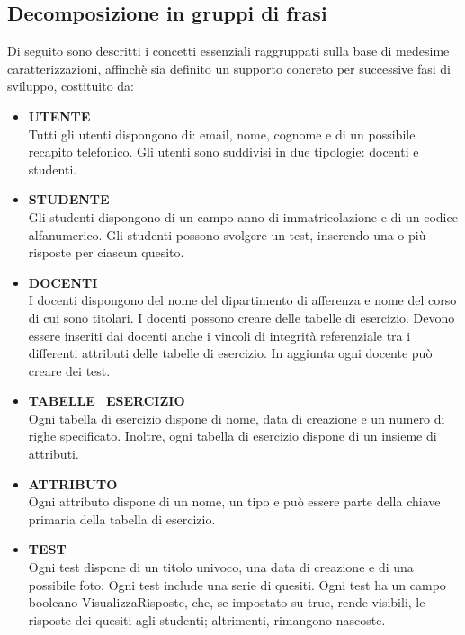\documentclass{article}
\begin{document}
\subsection{Decomposizione in gruppi di frasi}
\large
Di seguito sono descritti i concetti essenziali raggruppati sulla base di medesime caratterizzazioni, affinchè sia definito un supporto concreto per successive fasi di sviluppo, costituito da:
\begin{itemize}[label={-}]
    \itemsep1px
    \item \textbf{UTENTE} \vspace*{3px}\\ Tutti gli utenti dispongono di: email, nome, cognome e di un possibile recapito telefonico. Gli utenti sono suddivisi in due tipologie: docenti e studenti. 
    \item \textbf{STUDENTE} \vspace*{3px}\\ Gli studenti dispongono di un campo anno di immatricolazione e di un codice alfanumerico. Gli studenti possono svolgere un test, inserendo una o più risposte per ciascun quesito.
    \item \textbf{DOCENTI} \vspace*{3px}\\ I docenti dispongono del nome del dipartimento di afferenza e nome del corso di cui sono titolari. I docenti possono creare delle tabelle di esercizio. Devono essere inseriti dai docenti anche i vincoli di integrità referenziale tra i differenti attributi delle tabelle di esercizio. In aggiunta ogni docente può creare dei test.
    \item \textbf{TABELLE\_ESERCIZIO} \vspace*{3px}\\ Ogni tabella di esercizio dispone di nome, data di creazione e un numero di righe specificato. Inoltre, ogni tabella di esercizio dispone di un insieme di attributi.
    \item \textbf{ATTRIBUTO} \vspace*{3px}\\ Ogni attributo dispone di un nome, un tipo e può essere parte della chiave primaria della tabella di esercizio. 
    \item \textbf{TEST} \vspace*{3px}\\ Ogni test dispone di un titolo univoco, una data di creazione e di una possibile foto. Ogni test include una serie di quesiti. Ogni test ha un campo booleano VisualizzaRisposte, che, se impostato su true, rende visibili, le risposte dei quesiti agli studenti; altrimenti, rimangono nascoste.

\end{itemize}
\end{document}

